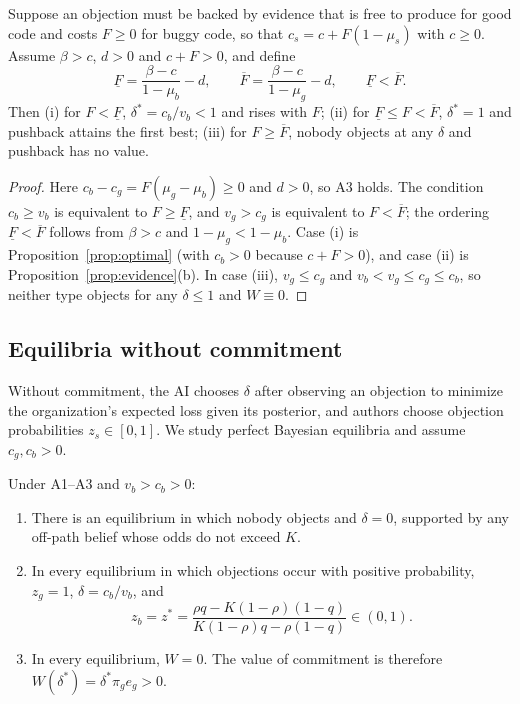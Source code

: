 \begin{corollary}\label{cor:window}
Suppose an objection must be backed by evidence that is free to produce for good code and costs
$F \ge 0$ for buggy code, so that $c_s = c + F(1-\mu_s)$ with $c \ge 0$. Assume $\beta > c$,
$d > 0$ and $c + F > 0$, and define
\[
  \underline{F} = \frac{\beta - c}{1-\mu_b} - d, \qquad
  \overline{F} = \frac{\beta - c}{1-\mu_g} - d, \qquad \underline{F} < \overline{F}.
\]
Then (i) for $F < \underline{F}$, $\delta^* = c_b/v_b < 1$ and rises with $F$;
(ii) for $\underline{F} \le F < \overline{F}$, $\delta^* = 1$ and pushback attains the first
best; (iii) for $F \ge \overline{F}$, nobody objects at any $\delta$ and pushback has no value.
\end{corollary}

\begin{proof}
Here $c_b - c_g = F(\mu_g - \mu_b) \ge 0$ and $d > 0$, so A3 holds. The condition $c_b \ge v_b$
is equivalent to $F \ge \underline{F}$, and $v_g > c_g$ is equivalent to $F < \overline{F}$;
the ordering $\underline{F} < \overline{F}$ follows from $\beta > c$ and
$1-\mu_g < 1-\mu_b$. Case (i) is Proposition~\ref{prop:optimal} (with $c_b > 0$ because
$c + F > 0$), and case (ii) is Proposition~\ref{prop:evidence}(b). In case (iii),
$v_g \le c_g$ and $v_b < v_g \le c_g \le c_b$, so neither type objects for any $\delta \le 1$
and $W \equiv 0$.
\end{proof}

\subsection{Equilibria without commitment}

Without commitment, the AI chooses $\delta$ after observing an objection to minimize the
organization's expected loss given its posterior, and authors choose objection probabilities
$z_s \in [0,1]$. We study perfect Bayesian equilibria and assume $c_g, c_b > 0$.

\begin{proposition}\label{prop:commitment}
Under A1--A3 and $v_b > c_b > 0$:
\begin{enumerate}
  \item There is an equilibrium in which nobody objects and $\delta = 0$, supported by any
  off-path belief whose odds do not exceed $K$.
  \item In every equilibrium in which objections occur with positive probability, $z_g = 1$,
  $\delta = c_b / v_b$, and
  \[
    z_b = z^* = \frac{\rho q - K(1-\rho)(1-q)}{K(1-\rho)q - \rho(1-q)} \in (0,1).
  \]
  \item In every equilibrium, $W = 0$. The value of commitment is therefore
  $W(\delta^*) = \delta^* \pi_g e_g > 0$.
\end{enumerate}
\end{proposition}

